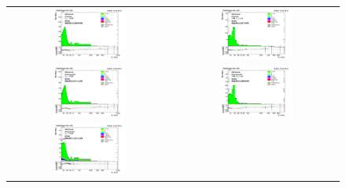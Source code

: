 \begin{figure}[htp]
  \begin{center}
    \begin{tabular}{cc}
      \includegraphics[width=0.45\textwidth]{figures/Zprime/2016/ScaleFactor/SameSign/nominal/stack_Et_Barrel_probes_PUW.png} &
      \includegraphics[width=0.45\textwidth]{figures/Zprime/2016/ScaleFactor/SameSign/nominal/stack_Et_Endcap_probes_PUW.png} \\
      \includegraphics[width=0.45\textwidth]{figures/Zprime/2016/ScaleFactor/SameSign/nominal/stack_Et_Barrel_pass_PUW.png} &
      \includegraphics[width=0.45\textwidth]{figures/Zprime/2016/ScaleFactor/SameSign/nominal/stack_Et_Endcap_pass_PUW.png}\\
      \includegraphics[width=0.45\textwidth]{figures/Zprime/2016/ScaleFactor/SameSign/nominal/stack_Et_Barrel_fail_PUW.png} &

\end{tabular}
\end{center}
\end{figure}
